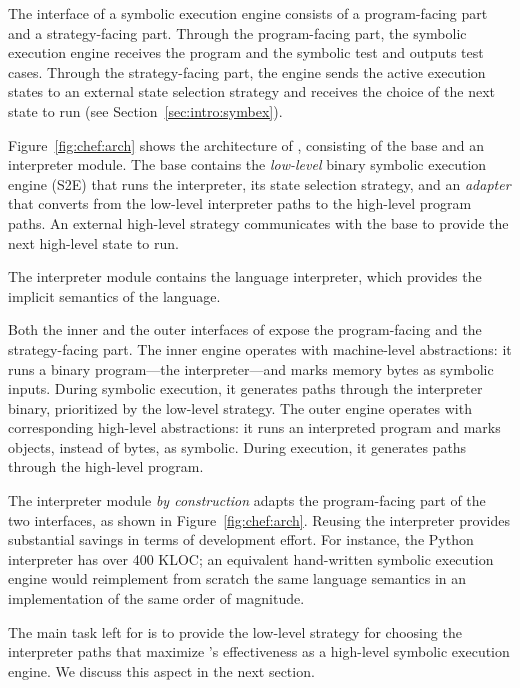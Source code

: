 The interface of a symbolic execution engine consists of a program-facing part and a strategy-facing part.
%
Through the program-facing part, the symbolic execution engine receives the program and the symbolic test and outputs test cases.
%
Through the strategy-facing part, the engine sends the active execution states to an external state selection strategy and receives the choice of the next state to run (see Section~\ref{sec:intro:symbex}).


Figure~\ref{fig:chef:arch} shows the architecture of \chef, consisting of the base and an interpreter module.
%
The base contains the \emph{low-level} binary symbolic execution engine (S2E) that runs the interpreter, its state selection strategy, and an \emph{adapter} that converts from the low-level interpreter paths to the high-level program paths.
%
An external high-level strategy communicates with the base to provide the next high-level state to run.

The interpreter module contains the language interpreter, which provides the implicit semantics of the language.

Both the inner and the outer interfaces of \chef expose the program-facing and the strategy-facing part.
%
The inner engine operates with machine-level abstractions: it runs a binary program---the interpreter---and marks memory bytes as symbolic inputs.  During symbolic execution, it generates paths through the interpreter binary, prioritized by the low-level strategy.
%
The outer engine operates with corresponding high-level abstractions: it runs an interpreted program and marks objects, instead of bytes, as symbolic.  During execution, it generates paths through the high-level program.

The interpreter module \emph{by construction} adapts the program-facing part of the two interfaces, as shown in Figure~\ref{fig:chef:arch}.
%
Reusing the interpreter provides substantial savings in terms of development effort.  For instance, the Python interpreter has over 400 KLOC; an equivalent hand-written symbolic execution engine would reimplement from scratch the same language semantics in an implementation of the same order of magnitude.

The main task left for \chef is to provide the low-level strategy for choosing the interpreter paths that maximize \chef's effectiveness as a high-level symbolic execution engine.
%
We discuss this aspect in the next section.


